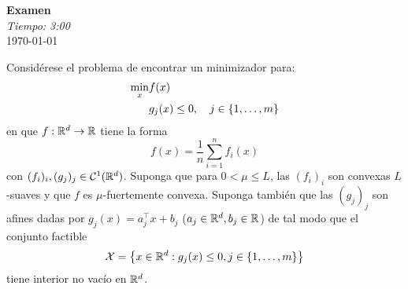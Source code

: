 \documentclass{article}
\begin{document}


\begin{center}
	\Huge{\textbf{Examen}}\\
	\normalsize \textit{Tiempo: 3:00}\\
	\today
\end{center}

\noindent Considérese el problema de encontrar un minimizador para:
\begin{align*}
	\min_x &f(x) \\
	& g_j(x) \leq 0, \quad j \in \qty{1, \dots, m}
\end{align*}
en que \(f: \mathbb{R}^d \to \mathbb{R}\) tiene la forma
\[f(x) = \frac{1}{n} \sum_{i=1}^n f_i(x)\]
con \((f_i)_i, (g_j)_j \in \mathcal{C}^1(\mathbb{R}^d)\). Suponga que para \(0 < \mu \leq L\), las \((f_i)_i\) son convexas \(L\)-suaves y que \(f\) es \(\mu\)-fuertemente convexa. Suponga también que las \((g_j)_j\) son afines dadas por \(g_j(x) = a_j^\top x + b_j\) (\(a_j \in \mathbb{R}^d , b_j \in \mathbb{R}\)) de tal modo que el conjunto factible
\[\mathcal{X} = \qty{x \in \mathbb{R}^d : g_j(x) \leq 0, j \in \qty{1, \dots, m}}\]
tiene interior no vacío en \(\mathbb{R}^d\).
\end{document}
